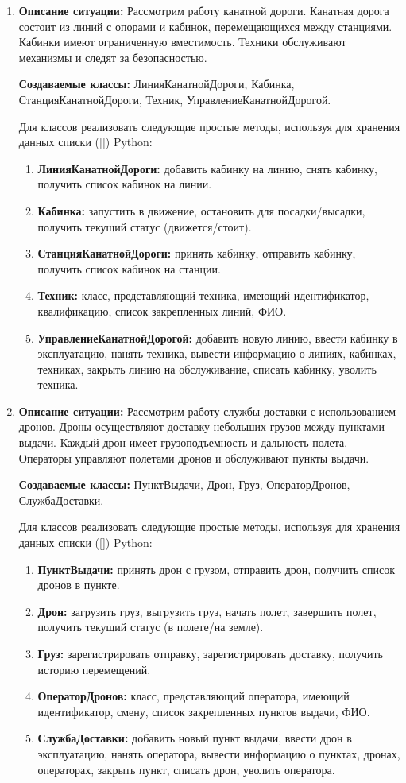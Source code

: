 \begin{enumerate}
\item
\textbf{Описание ситуации:}
Рассмотрим работу канатной дороги. Канатная дорога состоит из линий с опорами и кабинок, 
перемещающихся между станциями. 
Кабинки имеют ограниченную вместимость. Техники обслуживают механизмы и следят за безопасностью.

\textbf{Создаваемые классы:} ЛинияКанатнойДороги, Кабинка, СтанцияКанатнойДороги, Техник, УправлениеКанатнойДорогой.

Для классов реализовать следующие простые методы, используя для хранения данных списки ([]) Python:
\begin{enumerate}
\item \textbf{ЛинияКанатнойДороги:} добавить кабинку на линию, снять кабинку, 
получить список кабинок на линии.
\item \textbf{Кабинка:} запустить в движение, остановить для посадки/высадки, 
получить текущий статус (движется/стоит).
\item \textbf{СтанцияКанатнойДороги:} принять кабинку, отправить кабинку, 
получить список кабинок на станции.
\item \textbf{Техник:} класс, представляющий техника, имеющий идентификатор, 
квалификацию, список закрепленных линий, ФИО.
\item \textbf{УправлениеКанатнойДорогой:} добавить новую линию, 
ввести кабинку в эксплуатацию, нанять техника, вывести информацию о линиях, кабинках, техниках, 
закрыть линию на обслуживание, списать кабинку, уволить техника.
\end{enumerate}

\item
\textbf{Описание ситуации:}
Рассмотрим работу службы доставки с использованием дронов. 
Дроны осуществляют доставку небольших грузов между пунктами выдачи. 
Каждый дрон имеет грузоподъемность и дальность полета. 
Операторы управляют полетами дронов и обслуживают пункты выдачи.

\textbf{Создаваемые классы:} ПунктВыдачи, Дрон, Груз, ОператорДронов, СлужбаДоставки.

Для классов реализовать следующие простые методы, используя для хранения данных списки ([]) Python:
\begin{enumerate}
\item \textbf{ПунктВыдачи:} принять дрон с грузом, отправить дрон, получить список дронов в пункте.
\item \textbf{Дрон:} загрузить груз, выгрузить груз, 
начать полет, завершить полет, получить текущий статус (в полете/на земле).
\item \textbf{Груз:} зарегистрировать отправку, зарегистрировать доставку, 
получить историю перемещений.
\item \textbf{ОператорДронов:} класс, представляющий оператора, 
имеющий идентификатор, смену, список закрепленных пунктов выдачи, ФИО.
\item \textbf{СлужбаДоставки:} добавить новый пункт выдачи, 
ввести дрон в эксплуатацию, нанять оператора, вывести информацию о пунктах, 
дронах, операторах, закрыть пункт, списать дрон, уволить оператора.
\end{enumerate}

\end{enumerate}